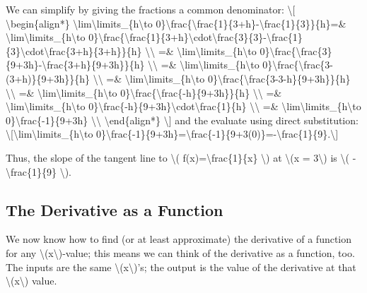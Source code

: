 We can simplify by giving the fractions a common denominator:
\textbackslash{}{[} \textbackslash{}begin\{align*\}
\textbackslash{}lim\textbackslash{}limits\_\{h\textbackslash{}to
0\}\textbackslash{}frac\{\textbackslash{}frac\{1\}\{3+h\}-\textbackslash{}frac\{1\}\{3\}\}\{h\}=\&
\textbackslash{}lim\textbackslash{}limits\_\{h\textbackslash{}to
0\}\textbackslash{}frac\{\textbackslash{}frac\{1\}\{3+h\}\textbackslash{}cdot\textbackslash{}frac\{3\}\{3\}-\textbackslash{}frac\{1\}\{3\}\textbackslash{}cdot\textbackslash{}frac\{3+h\}\{3+h\}\}\{h\}
\textbackslash{}\textbackslash{} =\&
\textbackslash{}lim\textbackslash{}limits\_\{h\textbackslash{}to
0\}\textbackslash{}frac\{\textbackslash{}frac\{3\}\{9+3h\}-\textbackslash{}frac\{3+h\}\{9+3h\}\}\{h\}
\textbackslash{}\textbackslash{} =\&
\textbackslash{}lim\textbackslash{}limits\_\{h\textbackslash{}to
0\}\textbackslash{}frac\{\textbackslash{}frac\{3-(3+h)\}\{9+3h\}\}\{h\}
\textbackslash{}\textbackslash{} =\&
\textbackslash{}lim\textbackslash{}limits\_\{h\textbackslash{}to
0\}\textbackslash{}frac\{\textbackslash{}frac\{3-3-h\}\{9+3h\}\}\{h\}
\textbackslash{}\textbackslash{} =\&
\textbackslash{}lim\textbackslash{}limits\_\{h\textbackslash{}to
0\}\textbackslash{}frac\{\textbackslash{}frac\{-h\}\{9+3h\}\}\{h\}
\textbackslash{}\textbackslash{} =\&
\textbackslash{}lim\textbackslash{}limits\_\{h\textbackslash{}to
0\}\textbackslash{}frac\{-h\}\{9+3h\}\textbackslash{}cdot\textbackslash{}frac\{1\}\{h\}
\textbackslash{}\textbackslash{} =\&
\textbackslash{}lim\textbackslash{}limits\_\{h\textbackslash{}to
0\}\textbackslash{}frac\{-1\}\{9+3h\} \textbackslash{}\textbackslash{}
\textbackslash{}end\{align*\} \textbackslash{}{]} and the evaluate using
direct substitution:
\textbackslash{}{[}\textbackslash{}lim\textbackslash{}limits\_\{h\textbackslash{}to
0\}\textbackslash{}frac\{-1\}\{9+3h\}=\textbackslash{}frac\{-1\}\{9+3(0)\}=-\textbackslash{}frac\{1\}\{9\}.\textbackslash{}{]}

Thus, the slope of the tangent line to \textbackslash{}(
f(x)=\textbackslash{}frac\{1\}\{x\} \textbackslash{}) at
\textbackslash{}(x = 3\textbackslash{}) is \textbackslash{}(
-\textbackslash{}frac\{1\}\{9\} \textbackslash{}).

\hypertarget{the-derivative-as-a-function}{%
\subsection{The Derivative as a
Function}\label{the-derivative-as-a-function}}

We now know how to find (or at least approximate) the derivative of a
function for any \textbackslash{}(x\textbackslash{})-value; this means
we can think of the derivative as a function, too. The inputs are the
same \textbackslash{}(x\textbackslash{})'s; the output is the value of
the derivative at that \textbackslash{}(x\textbackslash{}) value.

